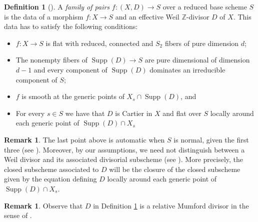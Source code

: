 \documentclass[11pt]{amsart}
\theoremstyle{definition}
\newtheorem{definition}[theorem]{Definition}
\newtheorem{remark}[theorem]{Remark}
\theoremstyle{remark}
\newcommand{\Supp}{\operatorname{Supp}}
\begin{document}
	\begin{definition}[{\cite[Definition 4.2 and Theorem 4.3]{kollarmodulibook}}]\label{def:family:of:pairs}
		A \emph{family of pairs} $f:(X,D) \to S$ over a reduced base scheme $S$ is the data of a morphism $f:X \to S$ and an effective Weil $\mathbb{Z}$-divisor 
		$D$ of $X$. This data has to satisfy the following conditions:
		\begin{itemize}
			\item $f:X \to S$ is flat with reduced, connected and $S_2$ fibers of pure dimension $d$;
			\item The nonempty fibers of $\Supp(D) \to S$ are pure dimensional of dimension $d-1$ and every component of $\Supp(D)$ dominates an irreducible component of $S$;
			\item $f$ is smooth at the generic points of $X_s \cap \Supp(D)$, and
			\item For every $s \in S$ we have that $D$ is Cartier in $X$ and flat over $S$ locally around each generic point of $\Supp(D) \cap X_s$ 
		\end{itemize}
	\end{definition}
	\begin{remark}\label{remark:the:terrible:condition:on:family:of:div:is:automatic:over:normal:bases}
		The last point above is automatic when $S$ is normal, given the first three (see \cite[Theorem 4.4]{kollarmodulibook}). Moreover, by our assumptions, we need not distinguish between a Weil divisor and its associated divisorial subscheme (see \cite[Section 4.3]{kollarmodulibook}). More precisely, the closed subscheme associated to $D$ will be the closure of the closed subscheme given by the equation defining $D$ locally around each generic point of $\Supp(D) \cap X_s$.
	\end{remark}
	
	\begin{remark}
		Observe that $D$ in Definition \ref{def:family:of:pairs} is a relative Mumford divisor in the sense of \cite[Definition 4.68]{kollarmodulibook}.
	\end{remark}
	
\end{document}
